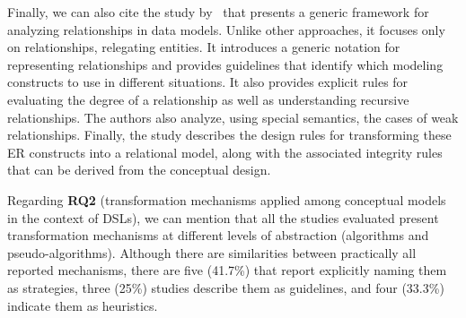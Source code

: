 Finally, we can also cite the study by~\cite{Dey:1999} that presents a generic framework for analyzing relationships in data models.
Unlike other approaches, it focuses only on relationships, relegating entities.
It introduces a generic notation for representing relationships and provides guidelines that identify which modeling constructs to use in different situations.
It also provides explicit rules for evaluating the degree of a relationship as well as understanding recursive relationships.
The authors also analyze, using special semantics, the cases of weak relationships.
Finally, the study describes the design rules for transforming these ER constructs into a relational model, along with the associated integrity rules that can be derived from the conceptual design.

Regarding \textbf{RQ2} (transformation mechanisms applied among conceptual models in the context of DSLs), we can mention that all the studies evaluated present transformation mechanisms at different levels of abstraction (algorithms and pseudo-algorithms).
Although there are similarities between practically all reported mechanisms, there are five (41.7\%) that report explicitly naming them as strategies, three (25\%) studies describe them as guidelines, and four (33.3\%) indicate them as heuristics.

